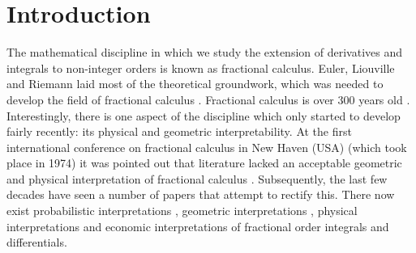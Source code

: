 \documentclass[twoside,reqno,11pt]{fcaa-var} %
\begin{document}
% 
% 
% 
% 
% 
% 
% 
% 
 
\section{Introduction}

\noindent
The mathematical discipline in which we study the extension of derivatives and integrals to non-integer orders is known as fractional calculus. Euler, Liouville and Riemann laid most 
of the theoretical groundwork, which was needed to develop the field of fractional calculus \cite{laurent1884}. Fractional calculus is over 300 years old \cite{machado17}. Interestingly, there is one aspect of the discipline which only started to develop fairly recently: its physical and geometric interpretability. At the first international conference on fractional calculus in
New Haven (USA) (which took place in 1974) it was pointed out that literature lacked an acceptable geometric and physical interpretation of fractional calculus \cite{ross06}. Subsequently, the last few decades have seen 
a number of papers that attempt to rectify this. There now exist probabilistic interpretations \cite{machado03,stanislavsky04}, geometric interpretations \cite{adda97,garcia2019,podlubny02,tarasov16}, physical interpretations \cite{rutman95, nigmatullin92} and economic 
interpretations \cite{tarasova17} of fractional order integrals and differentials.\\
\end{document}
